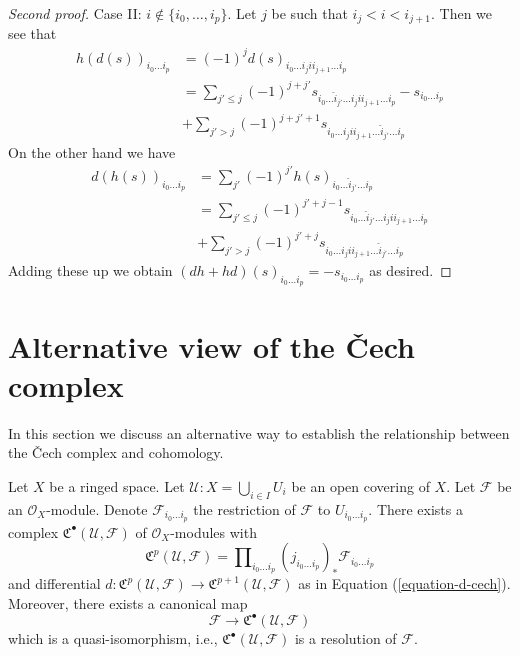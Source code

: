 \begin{proof}[Second proof]
\medskip\noindent
Case II: $i \not \in \{i_0, \ldots, i_p\}$. Let $j$ be such that
$i_j < i < i_{j + 1}$. Then we see that
\begin{align*}
h(d(s))_{i_0 \ldots i_p}
& =
(-1)^j d(s)_{i_0 \ldots i_j i i_{j + 1} \ldots i_p} \\
& =
\sum\nolimits_{j' \leq j} (-1)^{j + j'}
s_{i_0 \ldots \hat i_{j'} \ldots i_j i i_{j + 1} \ldots i_p} -
s_{i_0 \ldots i_p} \\
&
+ \sum\nolimits_{j' > j} (-1)^{j + j' + 1}
s_{i_0 \ldots i_j i i_{j + 1} \ldots \hat i_{j'} \ldots i_p}
\end{align*}
On the other hand we have
\begin{align*}
d(h(s))_{i_0 \ldots i_p}
& =
\sum\nolimits_{j'} (-1)^{j'} h(s)_{i_0 \ldots \hat i_{j'} \ldots i_p} \\
& =
\sum\nolimits_{j' \leq j} (-1)^{j' + j - 1}
s_{i_0 \ldots \hat i_{j'} \ldots i_j i i_{j + 1} \ldots i_p} \\
& +
\sum\nolimits_{j' > j} (-1)^{j' + j}
s_{i_0 \ldots i_j i i_{j + 1} \ldots \hat i_{j'} \ldots i_p}
\end{align*}
Adding these up we obtain
$(dh + hd)(s)_{i_0 \ldots i_p} = - s_{i_0 \ldots i_p}$
as desired.
\end{proof}





\section{Alternative view of the {\v C}ech complex}
\label{section-locally-finite-cech}

\noindent
In this section we discuss an alternative way to establish the relationship
between the {\v C}ech complex and cohomology.

\begin{lemma}
\label{lemma-covering-resolution}
Let $X$ be a ringed space. Let $\mathcal{U} : X = \bigcup_{i \in I} U_i$
be an open covering of $X$. Let $\mathcal{F}$ be an $\mathcal{O}_X$-module.
Denote $\mathcal{F}_{i_0 \ldots i_p}$ the restriction of
$\mathcal{F}$ to $U_{i_0 \ldots i_p}$. There exists a complex
${\mathfrak C}^\bullet(\mathcal{U}, \mathcal{F})$
of $\mathcal{O}_X$-modules with
$$
{\mathfrak C}^p(\mathcal{U}, \mathcal{F}) =
\prod\nolimits_{i_0 \ldots i_p}
(j_{i_0 \ldots i_p})_* \mathcal{F}_{i_0 \ldots i_p}
$$
and differential
$d : {\mathfrak C}^p(\mathcal{U}, \mathcal{F})
\to {\mathfrak C}^{p + 1}(\mathcal{U}, \mathcal{F})$
as in Equation (\ref{equation-d-cech}). Moreover, there exists a canonical
map
$$
\mathcal{F} \to {\mathfrak C}^\bullet(\mathcal{U}, \mathcal{F})
$$
which is a quasi-isomorphism, i.e.,
${\mathfrak C}^\bullet(\mathcal{U}, \mathcal{F})$
is a resolution of $\mathcal{F}$.
\end{lemma}

